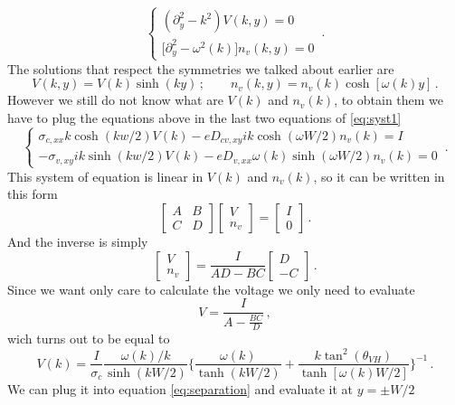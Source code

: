 \begin{equation}
    \begin{cases}
        (\partial_y^2 - k^2) V(k,y)=0\\
        \big[\partial_y^2 -\omega^2(k)\big]n_v(k,y)=0
    \end{cases}\,.
\end{equation}
The solutions that respect the symmetries we talked about earlier are
\begin{equation}
    V(k,y)=V(k)\sinh (ky)\,; \quad \quad n_v(k,y)=n_v(k)\cosh [\omega(k)y]\,.
    \label{eq:separation}
\end{equation}
However we still do not know what are $V(k)$ and $n_v(k)$, to obtain them we have to plug the equations above in the last two equations of \ref{eq:syst1}
\begin{equation}
    \begin{cases}
        \sigma_{c,xx}k\cosh(kw/2) V(k)-eD_{cv,xy}ik \cosh(\omega W/2)n_v(k)=I\\
        -\sigma_{v,xy} ik \sinh(kw/2) V(k)-eD_{v,xx}\omega(k)\sinh(\omega W/2) n_v(k)=0
    \end{cases}\,.
\end{equation}
This system of equation is linear in $V(k)$ and $n_v(k)$, so it can be written in this form
\begin{equation}
    \begin{bmatrix}
        A&B\\
        C&D
    \end{bmatrix}
    \begin{bmatrix}
        V\\n_v
    \end{bmatrix}=
    \begin{bmatrix}
        I\\0
    \end{bmatrix}\,.
\end{equation}
And the inverse is simply
\begin{equation}
    \begin{bmatrix}
        V\\n_v
    \end{bmatrix}=
    \frac I{AD-BC}
    \begin{bmatrix}
        D\\-C
    \end{bmatrix}\,.
\end{equation}
Since we want only care to calculate the voltage we only need to evaluate
\[
    V=\frac{I}{A-\frac{BC}D}    \,,
\]
wich turns out to be equal to
\begin{equation}
    V(k)=\frac I{\sigma_c}\frac{\omega(k)/k}{\sinh(kW/2)}
    \bigg\{
        \frac{\omega(k)}{\tanh(kW/2)} + \frac{k\tan^2(\theta_{VH})}{\tanh[\omega(k)W/2]}    
    \bigg\}^{-1}\,.
    \label{eq:vk}
\end{equation}
We can plug it into equation \ref{eq:separation} and evaluate it at $y=\pm W/2$


